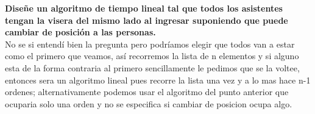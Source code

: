 \textbf{Diseñe un algoritmo de tiempo lineal tal que todos los asistentes tengan la visera del mismo lado al ingresar suponiendo que puede cambiar de posición a las personas.}\\

No se si entendí bien la pregunta pero podríamos elegir que todos van a estar como el primero que veamos, así recorremos la lista de n elementos y si alguno esta de la forma contraria al primero sencillamente le pedimos que se la voltee, entonces sera un algoritmo lineal pues recorre la lista una vez y a lo mas hace n-1 ordenes; alternativamente podemos usar el algoritmo del punto anterior que ocuparia solo una orden y no se especifica si cambiar de posicion ocupa algo.\\